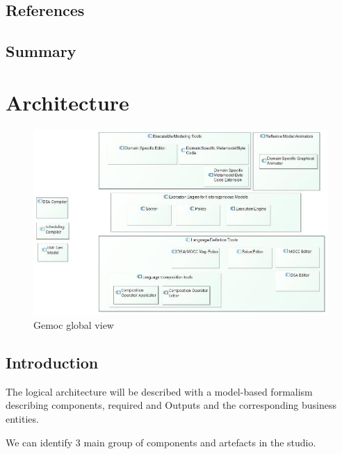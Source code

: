 \documentclass{gemoc} %
\begin{document}
\section{References}


\section{Summary}

 
\chapter{Architecture}
\begin{figure}[bt]
	\begin{center}
	\includegraphics*[trim=0.0cm 0.0cm 0cm 0.0cm, clip=true, width=1.0\linewidth]{../images/Global View.jpg}
	\caption{Gemoc global view}
	\label{fig:ComponentList}
	\end{center}
\end{figure}

\section{Introduction}
The logical architecture will be described with a model-based formalism describing components, required and Outputs and the corresponding business entities.

We can identify 3 main group of components and artefacts in the studio.
\end{document}
